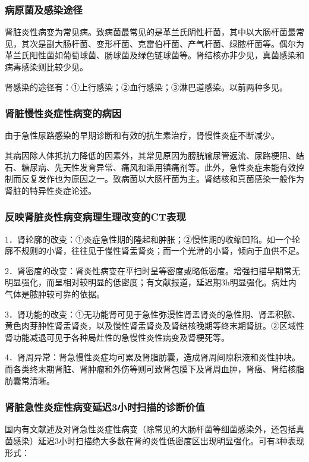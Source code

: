 \subsubsection{病原菌及感染途径}

肾脏炎性病变为常见病。致病菌最常见的是革兰氏阴性杆菌，其中以大肠杆菌最常见，其次是副大肠杆菌、变形杆菌、克雷伯杆菌、产气杆菌、绿脓杆菌等。偶尔为革兰氏阳性菌如葡萄球菌、肠球菌及绿色链球菌等。肾结核亦非少见，真菌感染和病毒感染则比较少见。

肾感染的途径有：①上行感染；②血行感染；③淋巴道感染。以前两种多见。

\subsubsection{肾脏慢性炎症性病变的病因}

由于急性尿路感染的早期诊断和有效的抗生素治疗，肾慢性炎症不断减少。

其病因除人体抵抗力降低的因素外，其常见原因为膀胱输尿管返流、尿路梗阻、结石、糖尿病、先天性发育异常、痛风和滥用镇痛剂等。此外，急性炎症未能有效控制而反复发作也为原因之一。致病菌以大肠杆菌为主。肾结核和真菌感染一般作为肾脏的特异性炎症论述。

\subsubsection{反映肾脏炎性病变病理生理改变的CT表现}

1．肾轮廓的改变：①炎症急性期的隆起和肿胀；②慢性期的收缩凹陷。如一个轮廓不规则的小肾，往往见于慢性肾盂肾炎；而一个光滑的小肾，倾向于血供不足。

2．肾密度的改变：肾炎性病变在平扫时呈等密度或略低密度。增强扫描早期常无明显强化，而呈相对较明显的低密度；有文献报道，延迟期3h明显强化。病灶内气体是脓肿较可靠的依据。

3．肾功能的改变：①无功能肾可见于急性弥漫性肾盂肾炎的急性期、肾盂积脓、黄色肉芽肿性肾盂肾炎，以及慢性肾盂肾炎及肾结核晚期等终末期肾脏。②区域性肾功能减退可见于各种局灶性的急慢性炎性病变及肾梗死等。

4．肾周异常：肾急慢性炎症均可累及肾脂肪囊，造成肾周间隙积液和炎性肿块。而各类终末期肾脏、肾肿瘤和外伤等则可致肾包膜下及肾周血肿，肾癌、肾结核脂肪囊常清晰。

\subsubsection{肾脏急性炎症性病变延迟3小时扫描的诊断价值}

国内有文献述及对肾急性炎症性病变（除常见的大肠杆菌等细菌感染外，还包括真菌感染）延迟3小时扫描绝大多数在肾的炎性低密度区出现明显强化。可有3种表现形式：


